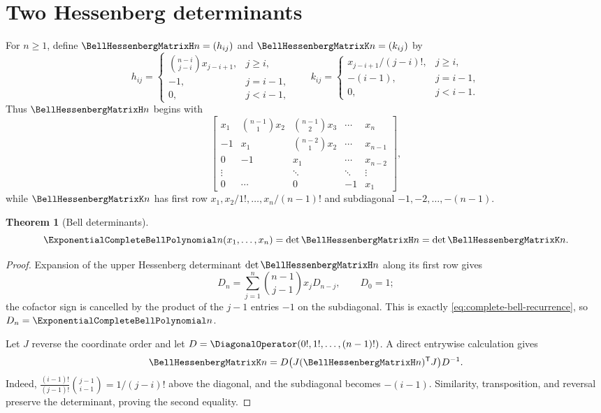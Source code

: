 \documentclass[11pt,a4paper,oneside,openany]{book}
\newtheorem{theorem}{Theorem}[chapter]
\theoremstyle{definition}
\theoremstyle{remark}
\begin{document}
\section{Two Hessenberg determinants}
For $n\ge1$, define $\BellHessenbergMatrixH n=(h_{ij})$ and $\BellHessenbergMatrixK n=(k_{ij})$ by
\[
 h_{ij}=\begin{cases}
 \binom{n-i}{j-i}x_{j-i+1},&j\ge i,\\
 -1,&j=i-1,\\0,&j<i-1,
 \end{cases}
 \qquad
 k_{ij}=\begin{cases}
 x_{j-i+1}/(j-i)!,&j\ge i,\\
 -(i-1),&j=i-1,\\0,&j<i-1.
 \end{cases}
\]
Thus $\BellHessenbergMatrixH n$ begins with
\[
\begin{bmatrix}
 x_1&\binom{n-1}{1}x_2&\binom{n-1}{2}x_3&\cdots&x_n\\
 -1&x_1&\binom{n-2}{1}x_2&\cdots&x_{n-1}\\
 0&-1&x_1&\cdots&x_{n-2}\\
 \vdots&&\ddots&\ddots&\vdots\\
 0&\cdots&0&-1&x_1
\end{bmatrix},
\]
while $\BellHessenbergMatrixK n$ has first row
$x_1,x_2/1!,\ldots,x_n/(n-1)!$ and subdiagonal
$-1,-2,\ldots,-(n-1)$.

\begin{theorem}[Bell determinants]\label{thm:bell-determinants}
\begin{equation}\label{eq:bell-determinants}
 \ExponentialCompleteBellPolynomial n(x_1,\ldots,x_n)
 =\det \BellHessenbergMatrixH n=\det \BellHessenbergMatrixK n.
\end{equation}
\end{theorem}
\begin{proof}
Expansion of the upper Hessenberg determinant $\det \BellHessenbergMatrixH n$ along its first row gives
\[
 D_n=\sum_{j=1}^{n}\binom{n-1}{j-1}x_jD_{n-j},\qquad D_0=1;
\]
the cofactor sign is cancelled by the product of the $j-1$ entries $-1$ on the
subdiagonal.  This is exactly \eqref{eq:complete-bell-recurrence}, so
$D_n=\ExponentialCompleteBellPolynomial n$.

Let $J$ reverse the coordinate order and let
$D=\DiagonalOperator(0!,1!,\ldots,(n-1)!)$.  A direct entrywise calculation gives
\[
 \BellHessenbergMatrixK n
 =D\bigl(J(\BellHessenbergMatrixH n)^{\mathsf T}J\bigr)D^{-1}.
\]
Indeed,
$\frac{(i-1)!}{(j-1)!}\binom{j-1}{i-1}=1/(j-i)!$ above the diagonal, and the
subdiagonal becomes $-(i-1)$.  Similarity, transposition, and reversal preserve
the determinant, proving the second equality.
\end{proof}
\end{document}
